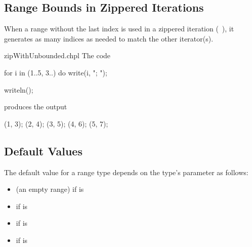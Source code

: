 \subsection{Range Bounds in Zippered Iterations}


When a range without the last index is used
in a zippered iteration (~),
it generates as many indices as needed
to match the other iterator(s).

\begin{chapelexample}{zipWithUnbounded.chpl}
The code
\begin{chapel}
for i in (1..5, 3..) do
  write(i, "; ");
\end{chapel}
\begin{chapelpost}
writeln();
\end{chapelpost}
produces the output 
\begin{chapelprintoutput}
(1, 3); (2, 4); (3, 5); (4, 6); (5, 7); 
\end{chapelprintoutput}
\end{chapelexample}

\subsection{Default Values}
\label{Range_Default_Values}

The default value for a range type depends on the type's
 parameter as follows:

\begin{itemize}

\item {} (an empty range) if  is 

\item {} if  is 

\item {} if  is 

\item {} if  is 

\end{itemize}


